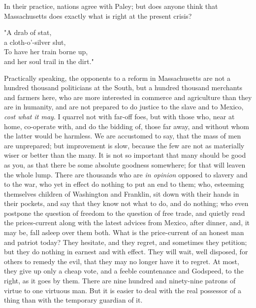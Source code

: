 \documentclass[12pt]{article}
\begin{document}
In their practice, nations agree with Paley; but does anyone think that
Massachusetts does exactly what is right at the present crisis?
\begin{displayquote}
"A drab of stat,\\
a cloth-o'-silver slut,\\
To have her train borne up,\\
and her soul trail in the dirt."
\end{displayquote}
Practically speaking, the opponents to a reform in Massachusetts are not
a hundred thousand politicians at the South, but a hundred thousand
merchants and farmers here, who are more interested in commerce and
agriculture than they are in humanity, and are not prepared to do
justice to the slave and to Mexico, \emph{cost what it may}. I quarrel
not with far-off foes, but with those who, near at home, co-operate
with, and do the bidding of, those far away, and without whom the latter
would be harmless. We are accustomed to say, that the mass of men are
unprepared; but improvement is slow, because the few are not as
materially wiser or better than the many. It is not so important that
many should be good as you, as that there be some absolute goodness
somewhere; for that will leaven the whole lump. There are thousands who
are \emph{in opinion} opposed to slavery and to the war, who yet in
effect do nothing to put an end to them; who, esteeming themselves
children of Washington and Franklin, sit down with their hands in their
pockets, and say that they know not what to do, and do nothing; who even
postpone the question of freedom to the question of free trade, and
quietly read the prices-current along with the latest advices from
Mexico, after dinner, and, it may be, fall asleep over them both. What
is the price-current of an honest man and patriot today? They hesitate,
and they regret, and sometimes they petition; but they do nothing in
earnest and with effect. They will wait, well disposed, for others to
remedy the evil, that they may no longer have it to regret. At most,
they give up only a cheap vote, and a feeble countenance and Godspeed,
to the right, as it goes by them. There are nine hundred and ninety-nine
patrons of virtue to one virtuous man. But it is easier to deal with the
real possessor of a thing than with the temporary guardian of it.
\end{document}
